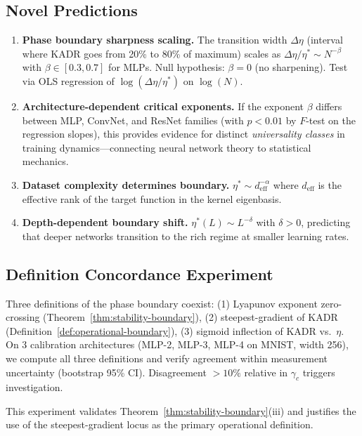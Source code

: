 \documentclass[11pt]{article}
\theoremstyle{definition}
\begin{document}
\subsection{Novel Predictions}
\label{sec:novel-predictions}

\begin{enumerate}[leftmargin=*]
\item \textbf{Phase boundary sharpness scaling.} The transition width $\Delta\eta$ (interval where KADR goes from 20\% to 80\% of maximum) scales as $\Delta\eta/\eta^* \sim N^{-\beta}$ with $\beta \in [0.3, 0.7]$ for MLPs. Null hypothesis: $\beta = 0$ (no sharpening). Test via OLS regression of $\log(\Delta\eta/\eta^*)$ on $\log(N)$.

\item \textbf{Architecture-dependent critical exponents.} If the exponent $\beta$ differs between MLP, ConvNet, and ResNet families (with $p < 0.01$ by $F$-test on the regression slopes), this provides evidence for distinct \emph{universality classes} in training dynamics---connecting neural network theory to statistical mechanics.

\item \textbf{Dataset complexity determines boundary.} $\eta^* \sim d_{\mathrm{eff}}^{-\alpha}$ where $d_{\mathrm{eff}}$ is the effective rank of the target function in the kernel eigenbasis.

\item \textbf{Depth-dependent boundary shift.} $\eta^*(L) \sim L^{-\delta}$ with $\delta > 0$, predicting that deeper networks transition to the rich regime at smaller learning rates.
\end{enumerate}

\subsection{Definition Concordance Experiment}
\label{sec:concordance}

Three definitions of the phase boundary coexist: (1) Lyapunov exponent zero-crossing (Theorem~\ref{thm:stability-boundary}), (2) steepest-gradient of KADR (Definition~\ref{def:operational-boundary}), (3) sigmoid inflection of KADR vs.\ $\eta$. On 3 calibration architectures (MLP-2, MLP-3, MLP-4 on MNIST, width 256), we compute all three definitions and verify agreement within measurement uncertainty (bootstrap 95\% CI). Disagreement $> 10\%$ relative in $\gamma_c$ triggers investigation.

This experiment validates Theorem~\ref{thm:stability-boundary}(iii) and justifies the use of the steepest-gradient locus as the primary operational definition.
\end{document}

